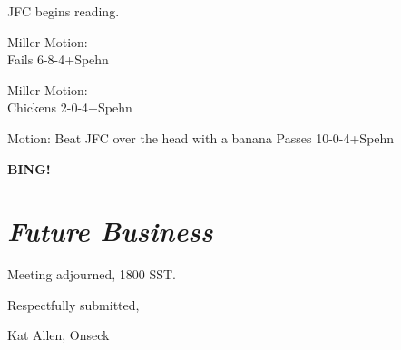 \documentclass[10pt]{article}
\newcommand{\bing}{{\bf BING!} }
\newcommand{\goto}[1]{\bing \vskip 12pt \section*{{\em{#1}}}}
\begin{document}
JFC begins reading.

Miller Motion:\\
Fails 6-8-4+Spehn

Miller Motion:\\
Chickens 2-0-4+Spehn

Motion: Beat JFC over the head with a banana
Passes 10-0-4+Spehn

\goto{Future Business}

\vspace{12pt}

\noindent
Meeting adjourned, 1800 SST.

\vspace{18pt}

\centerline{Respectfully submitted,}
\centerline{Kat Allen,  Onseck}
\end{document}
